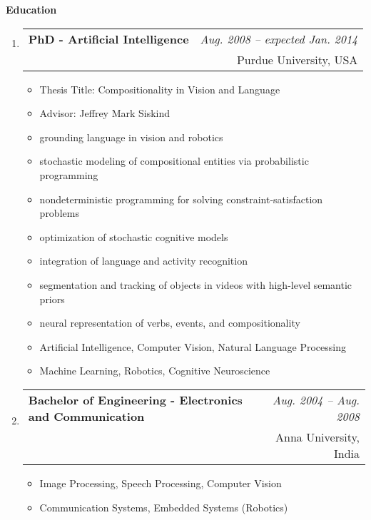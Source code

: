 \documentclass[10pt]{article}
\makeatletter
\newenvironment{position}[4]
{%
\item
  \begin{tabular*}{6.5in}{l@{\extracolsep{\fill}}r}
    \textbf{#1} & \textit{#2} \\ #3 & \small{#4} \\
  \end{tabular*}
  \begin{itemize} \setlength{\parskip}{-1pt}}
  { \end{itemize} }
\newenvironment{region}[2]{%
  \vspace*{0.5ex}
  {\large \textbf{#1}}
  \begin{enumerate}[\color{RoyalBlue}#2]}
  {\end{enumerate}}
\makeatother
\begin{document}
\begin{region} {Education}{}
  \begin{position}{PhD - Artificial Intelligence}
    {Aug. 2008 -- expected Jan. 2014}
    {}
    {Purdue University, USA}
    \vspace{-0.2in}
  \item Thesis Title: Compositionality in Vision and Language
  \item Advisor: Jeffrey Mark Siskind
    \vspace{0.05in}
  \item grounding language in vision and robotics
  \item stochastic modeling of compositional entities via probabilistic programming
  \item nondeterministic programming for solving constraint-satisfaction problems
  \item optimization of stochastic cognitive models
  \item integration of language and activity recognition
  \item segmentation and tracking of objects in videos with high-level semantic priors
  \item neural representation of verbs, events, and compositionality
    \vspace{0.05in}
  \item Artificial Intelligence, Computer Vision, Natural Language Processing
  \item Machine Learning, Robotics, Cognitive Neuroscience
  \end{position}
  \begin{position} {Bachelor of Engineering - Electronics and Communication}
    {Aug. 2004 -- Aug. 2008}
    {}
    {Anna University, India}
    \vspace{-0.2in}
  \item Image Processing, Speech Processing, Computer Vision
  \item Communication Systems, Embedded Systems (Robotics)
  \end{position}
\end{region}

\end{document}
